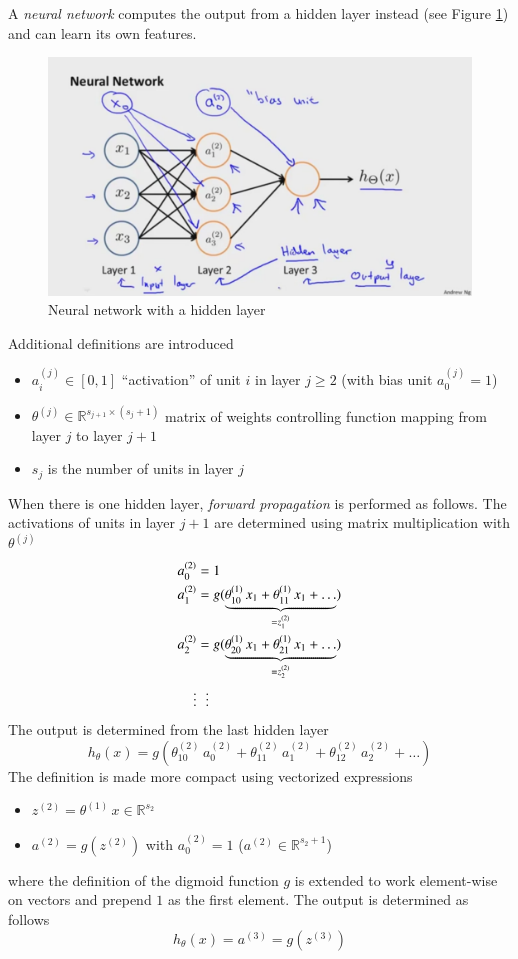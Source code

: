 \documentclass[a4paper,twoside,10pt]{article}
\begin{document}
A \emph{neural network} computes the output from a hidden layer instead (see Figure \ref{fig:hidden}) and can learn its own features.
\begin{figure}[htbp]
  \begin{center}
    \includegraphics[width=.6\textwidth]{hidden}
    \caption{Neural network with a hidden layer\citep{andrewng}\label{fig:hidden}}
  \end{center}
\end{figure}
Additional definitions are introduced
\begin{itemize}
  \item $a^{(j)}_i\in[0,1]$ ``activation'' of unit $i$ in layer $j\ge 2$ (with bias unit $a^{(j)}_0=1$)
  \item $\theta^{(j)}\in\mathbb{R}^{s_{j+1}\times(s_j+1)}$ matrix of weights controlling function mapping from layer $j$ to layer $j+1$
  \item $s_j$ is the number of units in layer $j$
\end{itemize}
When there is one hidden layer, \emph{forward propagation} is performed as follows.
The activations of units in layer $j+1$ are determined using matrix multiplication with $\theta^{(j)}$
\begin{align*}
  \begin{split}
    a^{(2)}_0&=1\\
    a^{(2)}_1&=g(\underbrace{\theta^{(1)}_{10}\,x_1+\theta^{(1)}_{11}\,x_1+\ldots}_{=z^{(2)}_1})\\
    a^{(2)}_2&=g(\underbrace{\theta^{(1)}_{20}\,x_1+\theta^{(1)}_{21}\,x_1+\ldots}_{=z^{(2)}_2})\\
    \vdots&\hphantom{=}\vdots
  \end{split}
\end{align*}
The output is determined from the last hidden layer
\begin{equation*}
  h_\theta(x)=g(\theta^{(2)}_{10}\,a^{(2)}_0+\theta^{(2)}_{11}\,a^{(2)}_1+\theta^{(2)}_{12}\,a^{(2)}_2+\ldots)
\end{equation*}
The definition is made more compact using vectorized expressions
\begin{itemize}
  \item $z^{(2)}=\theta^{(1)}\,x\in\mathbb{R}^{s_2}$
  \item $a^{(2)}=g(z^{(2)})$ with $a^{(2)}_0=1$ ($a^{(2)}\in\mathbb{R}^{s_2+1}$)
\end{itemize}
where the definition of the digmoid function $g$ is extended to work element-wise on vectors and prepend $1$ as the first element.
The output is determined as follows
\begin{equation*}
  h_\theta(x)=a^{(3)}=g(z^{(3)})
\end{equation*}
\end{document}
